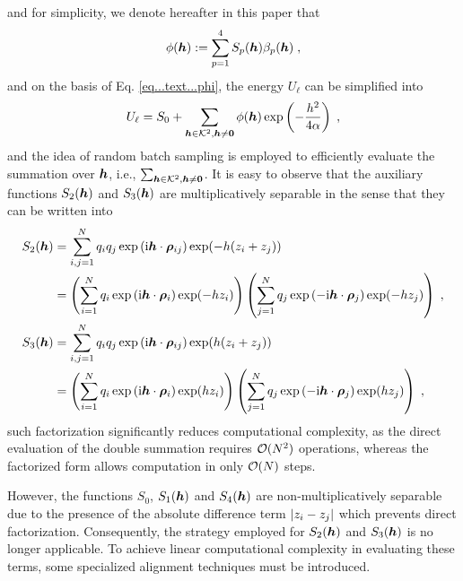 and for simplicity, we denote hereafter in this paper that 
\begin{equation}\label{eq...text...phi}
    \phi(\boldsymbol{h}):=\sum_{p=1}^4S_p(\boldsymbol{h}) \beta_p(\boldsymbol{h})\;,
\end{equation}
and on the basis of Eq. \eqref{eq...text...phi}, the   energy   $U_\ell$ can be simplified into 
\begin{equation} \label{eq...text...EnergywithPhi}
U_\ell =    S_0+ \sum_{\boldsymbol{h}\in\mathcal{K}^2,\boldsymbol{h}\neq\bm{0}} \phi(\boldsymbol{h})\exp\left(-\frac{h^2}{4\alpha}\right) \;,
\end{equation}
and the idea of random batch sampling is employed to efficiently evaluate the summation over   $\boldsymbol{h}$, i.e., $\sum_{\boldsymbol{h}\in\mathcal{K}^2,\boldsymbol{h}\neq\bm{0}}$. 
It is easy to observe that  the  auxiliary functions  $S_2(\boldsymbol{h})$ and $S_3(\boldsymbol{h})$ are multiplicatively separable  in the sense that  they can be written into
\begin{align*}
S_2(\boldsymbol{h})&=\sum_{i,j=1}^Nq_iq_j  \exp{(\mathrm{i} \boldsymbol{h} \cdot \boldsymbol{\rho}_{ij})}\exp(-h(z_i+z_j))\\
&=\left(\sum_{i=1}^Nq_i\exp{(\mathrm{i} \boldsymbol{h} \cdot \boldsymbol{\rho}_{i})}\exp(-hz_i)\right)\left(\sum_{j=1}^Nq_j\exp{(-\mathrm{i} \boldsymbol{h} \cdot \boldsymbol{\rho}_{j})}\exp(-hz_j)\right)\;,\\
S_3(\boldsymbol{h})&=\sum_{i,j=1}^Nq_iq_j  \exp{(\mathrm{i} \boldsymbol{h} \cdot \boldsymbol{\rho}_{ij})}\exp(h(z_i+z_j))\\
&=\left(\sum_{i=1}^Nq_i  \exp{(\mathrm{i} \boldsymbol{h} \cdot \boldsymbol{\rho}_{i})}\exp(hz_i)\right)\left(\sum_{j=1}^Nq_j  \exp{(-\mathrm{i} \boldsymbol{h} \cdot \boldsymbol{\rho}_{j})}\exp(hz_j)\right)\;,
\end{align*}
such factorization significantly reduces computational complexity, as the direct evaluation of the double summation requires 
$\mathcal{O}(N^2)$ operations, whereas the factorized form allows computation in only 
$\mathcal{O}(N)$ steps.

However, the functions $S_0$,  $S_1(\boldsymbol{h})$ and $S_4(\boldsymbol{h})$  are non-multiplicatively separable due to the presence of the absolute difference term $\lvert z_i - z_j\rvert$ which prevents direct factorization. Consequently, the strategy employed for 
$S_2(\boldsymbol{h})$ and $S_3(\boldsymbol{h})$ is no longer applicable. To achieve linear computational complexity in evaluating these terms,  some specialized alignment techniques must be introduced.

